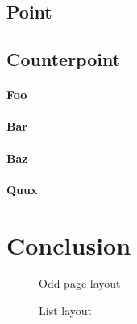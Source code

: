 \documentclass{mitsuba}
\begin{document}
\section{Point}

\kant[11-15]

\section{Counterpoint}

\kant[16]

\subsubsection{Foo}

\kant[17]

\subsubsection{Bar}

\kant[18]

\subsubsection{Baz}

\kant[19]

\subsubsection{Quux}

\kant[20]

\chapter{Conclusion}

\kant[21]

\clearpage

\begin{figure*}
\currentpage
\printheadingsfalse
\oddpagelayouttrue
\twocolumnlayouttrue
\pagedesign
\caption{Odd page layout}
\end{figure*}

\begin{figure*}
\currentlist
\printheadingsfalse
\listdesign
\caption{List layout}
\end{figure*}
\end{document}
